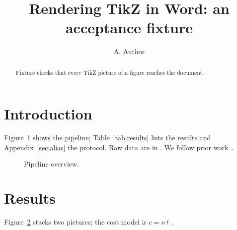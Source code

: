 \documentclass[10pt,twocolumn,letterpaper]{article}
\title{Rendering TikZ in Word: an acceptance fixture}
\author{A. Author}
\date{}
\newcommand{\ours}{\textup{Fixture}}
\begin{document}
\maketitle

\begin{abstract}
\ours{} checks that every TikZ picture of a figure reaches the document.
\end{abstract}

\section{Introduction}
\label{sec:intro}
Figure~\ref{fig:pipeline} shows the pipeline; Table~\ref{tab:results}
lists the results and Appendix~\ref{sec:alias} the protocol. Raw data are
in . We follow prior work~\citep{knuth1984}.

\begin{figure}[t]
\centering

\caption{Pipeline overview. \protect}
\label{fig:pipeline}
\end{figure}

\section{Results}


\begin{figure}[t]
\centering

\par\vspace{2mm}

\caption{\protect}
\label{fig:bars}
\end{figure}

Figure~\ref{fig:bars} stacks two pictures; the cost model is $c = n\,t$
\citep{lamport1994}.

\clearpage
\nobalance
{}
{\small


}

\clearpage
\onecolumn
\appendix

\end{document}
